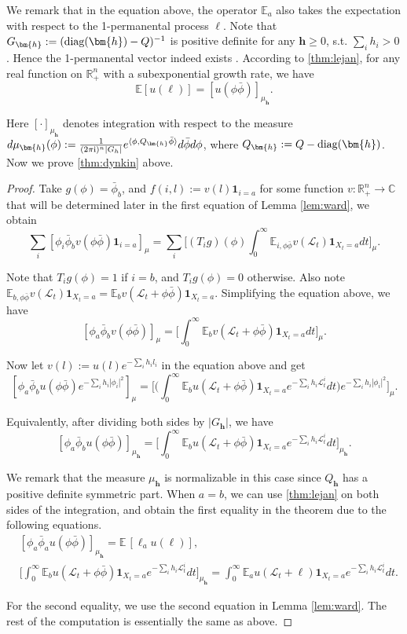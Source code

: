 \documentclass[a4paper, 11pt]{article}
\newcommand{\E}{\mathbb{E}}
\newcommand{\ind}{\mathbf{1}}
\newcommand{\Ell}{\mathcal{L}}
\newcommand{\diag}{\textnormal{diag}}
\newcommand{\compi}{\textnormal{i}}
\begin{document}
We remark that in the equation above, the operator $\E_a$ also takes the expectation with respect to the 1-permanental process $\ell$. Note that $G_{\bm{h}}:=(\diag(\bm{h})-Q)^{-1}$ is positive definite for any $\bm{h}\geq 0$, s.t. $\sum_i h_i>0$. Hence the 1-permanental vector indeed exists \cite{ek09}. According to \cref{thm:lejan}, for any real function on $\mathbb{R}_+^n$ with a subexponential growth rate, we have
\[\E[ u(\ell)] = [u(\phi\bar{\phi})]_{\mu_{\bm{h}}}.\]

Here $[\cdot]_{\mu_{\bm{h}}}$ denotes integration with respect to the measure $d\mu_{\bm{h}}(\phi):=\frac{1}{(2\pi\compi)^n|G_h|}e^{\langle \phi, Q_{\bm{h}}\bar{\phi}\rangle}d\bar{\phi}d\phi$, where $Q_{\bm{h}}:=Q-\diag(\bm{h})$. Now we prove \cref{thm:dynkin} above.
\begin{proof}

Take $g(\phi)=\bar{\phi}_b$, and $f(i,l):= v(l)\ind_{i=a}$ for some function $v:\mathbb{R}_+^n\rightarrow \mathbb{C}$ that will be determined later in the first equation of Lemma \ref{lem:ward}, we obtain
\[\sum_i[ \phi_i \bar{\phi}_b v(\phi\bar{\phi})\ind_{i=a} ]_\mu=\sum_i\bigg[ (T_ig)(\phi)\int_0^\infty \E_{i,\phi\bar{\phi}}v(\Ell_t)\ind_{X_t=a}dt\bigg]_\mu.\]

Note that $T_ig(\phi)=1$ if $i=b$, and $T_ig(\phi)=0$ otherwise. Also note $\E_{b,\phi\bar{\phi}}v(\Ell_t)\ind_{X_t=a}=\E_b v(\Ell_t+\phi\bar{\phi})\ind_{X_t=a}$. Simplifying the equation above, we have
\[[\phi_a\bar{\phi}_b v(\phi\bar{\phi})]_\mu=\bigg[ \int_0^\infty \E_b v(\Ell_t+\phi\bar{\phi})\ind_{X_t=a}dt\bigg]_\mu. \]

Now let $ v(l):=u(l)e^{-\sum_ih_il_i}$ in the equation above and get
\[[\phi_a\bar{\phi}_b u(\phi\bar{\phi})e^{-\sum_i h_i|\phi_i|^2}]_\mu=\bigg[\bigg(\int_0^\infty \E_b u(\Ell_t+\phi\bar{\phi})\ind_{X_t=a}e^{-\sum_i h_i\Ell_t^i}dt\bigg)e^{-\sum_i h_i|\phi_i|^2}\bigg]_\mu. \]

Equivalently, after dividing both sides by $|G_{\bm{h}}|$, we have
\[[\phi_a\bar{\phi}_b u(\phi\bar{\phi})]_{\mu_{\bm{h}}}=\bigg[\int_0^\infty \E_b u(\Ell_t+\phi\bar{\phi})\ind_{X_t=a}e^{-\sum_i h_i\Ell_t^i}dt\bigg]_{\mu_{\bm{h}}}.\]

We remark that the measure $\mu_{\bm{h}}$ is normalizable in this case since $Q_{\bm{h}}$ has a positive definite symmetric part.
When $a=b$, we can use \cref{thm:lejan} on both sides of the integration, and obtain the first equality in the theorem due to the following equations.
\begin{align*}
& [\phi_a\bar{\phi}_a u(\phi\bar{\phi})]_{\mu_{\bm{h}}}=\E\,[\ell_a u(\ell)],\\
& \bigg[\int_0^\infty \E_b u(\Ell_t+\phi\bar{\phi})\ind_{X_t=a}e^{-\sum_i h_i\Ell_t^i}dt\bigg]_{\mu_{\bm{h}}}=\int_0^\infty \E_a u(\Ell_t+\ell)\ind_{X_t=a}e^{-\sum_i h_i\Ell_t^i}dt.
\end{align*}

For the second equality, we use the second equation in Lemma \ref{lem:ward}. The rest of the computation is essentially the same as above.
\end{proof}
\end{document}
